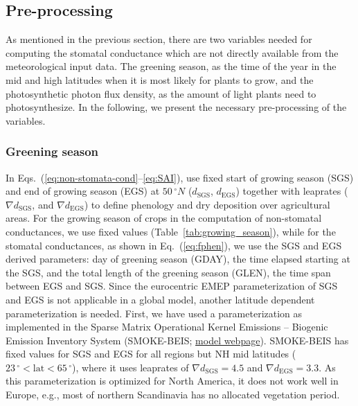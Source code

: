 \documentclass[gmd, manuscript]{copernicus}
\begin{document}
\subsection{Pre-processing}
\label{subsec:pre-pro}
As mentioned in the previous section, there are two variables needed for computing the stomatal conductance which are not directly available from the meteorological input data. The greening season, as the time of the year in the mid and high latitudes when it is most likely for plants to grow, and the photosynthetic photon flux density, as the amount of light plants need to photosynthesize. In the following, we present the necessary pre-processing of the variables.
\subsubsection{Greening season}
\label{subsubsec:greening}
In Eqs.~(\ref{eq:non-stomata-cond}--\ref{eq:SAI}), \citet{ACP:Simpson2012} use fixed start of growing season (SGS) and end of growing season (EGS) at $50\,\unit{^\circ N}$ ($d_\text{SGS}$, $d_\text{EGS}$) together with leaprates ($\nabla d_\text{SGS}$, and $\nabla d_\text{EGS}$) to define phenology and dry deposition over agricultural areas. For the growing season of crops in the computation of non-stomatal conductances, we use fixed values (Table~\ref{tab:growing_season}), while for the stomatal conductances, as shown in Eq.~(\ref{eq:fphen}), we use the SGS and EGS derived parameters: day of greening season (GDAY), the time elapsed starting at the SGS, and the total length of the greening season (GLEN), the time span between EGS and SGS. Since the eurocentric EMEP parameterization of SGS and EGS is not applicable in a global model, another latitude dependent parameterization is needed. First, we have used a parameterization as implemented in the Sparse Matrix Operational Kernel Emissions -- Biogenic Emission Inventory System (SMOKE-BEIS; \href{https://www.epa.gov/air-emissions-modeling/biogenic-emission-inventory-system-beis}{model webpage}). SMOKE-BEIS has fixed values for SGS and EGS for all regions but NH mid latitudes ($23\,\unit{^\circ} < \text{lat} < 65\,\unit{^\circ}$), where it uses leaprates of $\nabla d_\text{SGS} = 4.5$ and $\nabla d_\text{EGS} = 3.3$. As this parameterization is optimized for North America, it does not work well in Europe, e.g., most of northern Scandinavia has no allocated vegetation period. 
\end{document}
